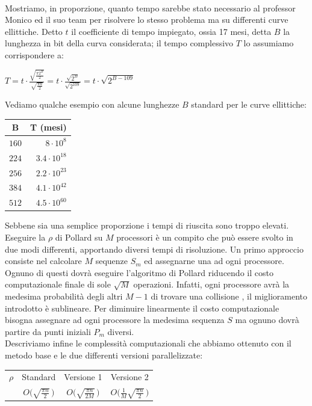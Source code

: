 \documentclass[a4paper,12pt]{tesiinfo}
\newcommand\ddfrac[2]{\frac{\displaystyle #1}{\displaystyle #2}}
\begin{document}
\\
Mostriamo, in proporzione, quanto tempo sarebbe stato necessario al professor Monico ed il suo team per risolvere lo stesso problema ma su differenti curve ellittiche. Detto $t$ il coefficiente di tempo impiegato, ossia 17 mesi, detta $B$ la lunghezza in bit della curva considerata; il tempo complessivo $T$ lo assumiamo corrispondere a:
\begin{center}
 $T = t \cdot \ddfrac{\sqrt{\ddfrac{\pi 2^B}{2}}}{\sqrt{\ddfrac{\pi n}{2}}} = t \cdot \ddfrac{\sqrt{2^{B}}}{\sqrt{2^{109}}} = t \cdot \sqrt{2^{B-109}}$
\end{center}
Vediamo qualche esempio con alcune lunghezze $B$ standard per le curve ellittiche:
\begin{center}
\begin{tabular}{ c r }
 B & T (mesi)\\
 \hline
 $160$ &$8 \cdot 10^8$\\
 $224$ &$3.4 \cdot 10^{18}$\\
 $256$ &$2.2 \cdot 10^{23}$\\
 $384$ &$4.1 \cdot 10^{42}$\\
 $512$ &$4.5 \cdot 10^{60}$
\end{tabular}
\end{center}
Sebbene sia una semplice proporzione i tempi di riuscita sono troppo elevati.
\\
Eseguire la $\rho$ di Pollard su $M$ processori \`e un compito che pu\`o essere svolto in due modi differenti, apportando diversi tempi di risoluzione. Un primo approccio consiste nel calcolare $M$ sequenze $S_m$ ed assegnarne una ad ogni processore. Ognuno di questi dovr\`a eseguire l'algoritmo di Pollard riducendo il costo computazionale finale di sole $\sqrt{M}$ operazioni. Infatti, ogni processore avr\`a la medesima probabilit\`a degli altri $M-1$ di trovare una collisione \cite{rho speed1, rho speed2}, il miglioramento introdotto \`e sublineare. Per diminuire linearmente il costo computazionale bisogna assegnare ad ogni processore la medesima sequenza $S$ ma ognuno dovr\`a partire da punti iniziali $P_m$ diversi. 
\\
Descriviamo infine le complessit\`a computazionali che abbiamo ottenuto con il metodo base e le due differenti versioni parallelizzate:
\begin{center}
\begin{tabular}{l c  c  c}
    $\rho$ & Standard & Versione 1 & Versione 2\\
    &  $O\Big (\sqrt{\ddfrac{\pi n}{2}}\, \Big )$ & $O \Big (\sqrt{\ddfrac{\pi n}{2M}}\, \Big )$ & $O\Big (\ddfrac{1}{M}\sqrt{\ddfrac{\pi n}{2}}\, \Big )$
\end{tabular}
\end{center}
%
%
%
%
%
%
%
%
%
\end{document}
